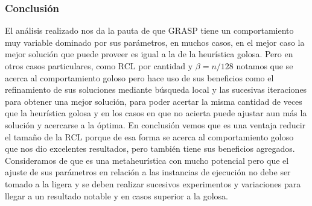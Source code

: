 \subsubsection{Conclusi\'on}

El an\'alisis realizado nos da la pauta de que GRASP tiene un comportamiento muy variable dominado por sus par\'ametros, en muchos casos, en el mejor caso la mejor soluci\'on que puede proveer es igual a la de la heur\'istica golosa. Pero en otros casos particulares, como RCL por cantidad y $\beta = n/128$ notamos que se acerca al comportamiento goloso pero hace uso de sus beneficios como el refinamiento de sus soluciones mediante b\'usqueda local y las sucesivas iteraciones para obtener una mejor soluci\'on, para poder acertar la misma cantidad de veces que la heur\'istica golosa y en los casos en que no acierta puede ajustar aun m\'as la soluci\'on y acercarse a la \'optima. En conclusi\'on vemos que es una ventaja reducir el tama\~no de la RCL porque de esa forma se acerca al comportamiento goloso que nos dio excelentes resultados, pero tambi\'en tiene sus beneficios agregados. Consideramos de que es una metaheur\'istica con mucho potencial pero que el ajuste de sus par\'ametros en relaci\'on a las instancias de ejecuci\'on no debe ser tomado a la ligera y se deben realizar sucesivos experimentos y variaciones para llegar a un resultado notable y en casos superior a la golosa.

